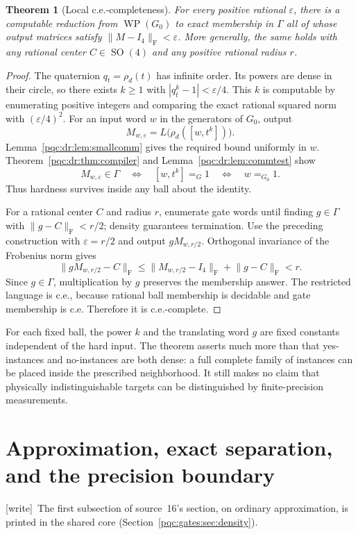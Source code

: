\documentclass[11pt,letterpaper]{article}
\numberwithin{equation}{section}
\newtheorem{theorem}{Theorem}[section]
\theoremstyle{definition}
\theoremstyle{remark}
\newcommand{\wtag}{\textup{[write]}}
\newcommand{\Frob}[1]{\lVert #1\rVert_{\mathrm F}}
\newcommand{\srcmark}[1]{\par\noindent{\small\itshape [source~#1]}\par}
\newcommand{\SO}{\operatorname{SO}}
\newcommand{\WP}{\operatorname{WP}}
\begin{document}
\begin{theorem}[Local c.e.-completeness]
\label{pqc:dr:thm:local}
For every positive rational $\varepsilon$, there is a computable reduction
from $\WP(G_0)$ to exact membership in $\Gamma$ all of whose output
matrices satisfy $\Frob{M-I_4}<\varepsilon$. More generally, the same
holds with any rational center $C\in\SO(4)$ and any positive rational
radius $r$.
\end{theorem}
\begin{proof}
The quaternion $q_t=\rho_d(t)$ has infinite order. Its powers are dense
in their circle, so there exists $k\geq1$ with
$|q_t^k-1|<\varepsilon/4$. This $k$ is computable by enumerating positive
integers and comparing the exact rational squared norm with
$(\varepsilon/4)^2$.
For an input word $w$ in the generators of $G_0$, output
\begin{equation}
 M_{w,\varepsilon}=L\bigl(\rho_d([w,t^k])\bigr).
 \label{pqc:dr:eq:localtarget}
\end{equation}
Lemma~\ref{pqc:dr:lem:smallcomm} gives the required bound uniformly in $w$.
Theorem~\ref{pqc:dr:thm:compiler} and Lemma~\ref{pqc:dr:lem:commtest} show
\[
 M_{w,\varepsilon}\in\Gamma
 \quad\Longleftrightarrow\quad [w,t^k]=_G1
 \quad\Longleftrightarrow\quad w=_{G_0}1.
\]
Thus hardness survives inside any ball about the identity.

For a rational center $C$ and radius $r$, enumerate gate words until
finding $g\in\Gamma$ with $\Frob{g-C}<r/2$; density guarantees
termination. Use the preceding construction with $\varepsilon=r/2$
and output $gM_{w,r/2}$. Orthogonal invariance of the Frobenius norm gives
\[
 \Frob{gM_{w,r/2}-C}
 \leq\Frob{M_{w,r/2}-I_4}+\Frob{g-C}<r.
\]
Since $g\in\Gamma$, multiplication by $g$ preserves the membership
answer. The restricted language is c.e., because rational ball membership
is decidable and gate membership is c.e. Therefore it is c.e.-complete.
\end{proof}

For each fixed ball, the power $k$ and the translating word $g$ are fixed
constants independent of the hard input. The theorem asserts much more
than that yes-instances and no-instances are both dense: a full complete
family of instances can be placed inside the prescribed neighborhood.
It still makes no claim that physically indistinguishable targets can
be distinguished by finite-precision measurements.
\section{Approximation, exact separation, and the precision boundary}
\label{pqc:dr:sec:approx}
\srcmark{16}
\wtag\ The first subsection of source~16's section, on ordinary approximation,
is printed in the shared core (Section~\ref{pqc:gates:sec:density}).
\end{document}
